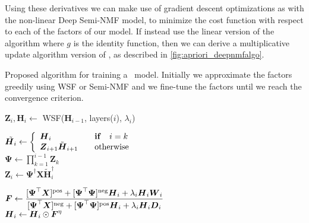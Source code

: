 \documentclass[10pt,journal,compsoc]{IEEEtran}
\begin{document}
Using these derivatives we can make use of gradient descent optimizations as with the non-linear Deep Semi-NMF model, to minimize the cost function with respect to each of the factors of our model. If instead use the linear version of the algorithm where $g$ is the identity function, then we can derive a multiplicative update algorithm version of \dwsf, as described in \autoref{fig:apriori_deepnmfalgo}.

\begin{algorithm}[tb]
\caption{Proposed algorithm for training a \dwsf~model. Initially we approximate the factors greedily using WSF or Semi-NMF and we fine-tune the factors until we reach the convergence criterion.}

\begin{algorithmic}
    \label{fig:apriori_deepnmfalgo}
        \STATE{}
            \STATE ${\boldsymbol Z}_i, {\boldsymbol H}_i \gets  $ {\sc WSF}(${\boldsymbol H}_{i-1}$, layers($i$), $\lambda_i$) 
        \ENDFOR

        \STATE{}

        \REPEAT
                \STATE
       $\tilde{{\boldsymbol H}_i} \gets \left\{
          \begin{array}{l l}
            {\boldsymbol H}_i           & \quad \text{\textbf{if}} \quad i = k \\
            {\boldsymbol Z}_{i+1} \tilde{\boldsymbol H}_{i+1} & \quad \text{otherwise}\\
          \end{array}\right.$ \\
       ${\boldsymbol \Psi} \gets  \prod_{k=1}^{i-1}{{\boldsymbol Z}_k}$ \\
       ${\boldsymbol Z}_i \gets {\boldsymbol \Psi}^{\dagger} {\boldsymbol X} \tilde{\boldsymbol H}_i^{\dagger}$ \\
   
       
       \newcommand{\hNum}{[{\boldsymbol \Psi}^{\top} {\boldsymbol X}]^{\text{pos}} + [{\boldsymbol \Psi}^{\top} {\boldsymbol \Psi}]^{\text{neg}} {\boldsymbol H}_i + \lambda_i \bs{H}_i \bs{W}_{i}}
       \newcommand{\hDenum}{[{\boldsymbol \Psi}^{\top} {\boldsymbol X}]^{\text{neg}} + [{\boldsymbol \Psi}^{\top} {\boldsymbol \Psi}]^{\text{pos}} {\boldsymbol H}_i + \lambda_i \bs{H}_i \bs{D}_i}
       
       $\bs{F} \gets \dfrac{\hNum}{\hDenum}$ \\
       
        ${\boldsymbol H}_i \gets  {\boldsymbol H}_i \odot \boldsymbol{F}^{\eta}$
            \ENDFOR
    \end{algorithmic}
\end{algorithm}
\end{document}
